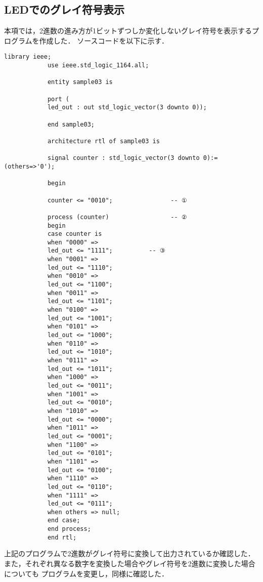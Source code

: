 \documentclass{ltjsarticle}
\begin{document}
	\subsection{LEDでのグレイ符号表示}
		本項では，2進数の進み方が1ビットずつしか変化しないグレイ符号を表示するプログラムを作成した．
		ソースコードを以下に示す．
		\begin{lstlisting}[caption=sample3, label=code:sample3]
			library ieee;
			use ieee.std_logic_1164.all;

			entity sample03 is

			port (
			led_out : out std_logic_vector(3 downto 0));

			end sample03;

			architecture rtl of sample03 is

			signal counter : std_logic_vector(3 downto 0):= (others=>'0');

			begin

			counter <= "0010";                -- ①

			process (counter)                 -- ②
			begin
			case counter is
			when "0000" =>
			led_out <= "1111";          -- ③
			when "0001" =>
			led_out <= "1110";
			when "0010" =>
			led_out <= "1100";
			when "0011" =>
			led_out <= "1101";
			when "0100" =>
			led_out <= "1001";
			when "0101" =>
			led_out <= "1000";
			when "0110" =>
			led_out <= "1010";
			when "0111" =>
			led_out <= "1011";
			when "1000" =>
			led_out <= "0011";
			when "1001" =>
			led_out <= "0010";
			when "1010" =>
			led_out <= "0000";
			when "1011" =>
			led_out <= "0001";
			when "1100" =>
			led_out <= "0101";
			when "1101" =>
			led_out <= "0100";
			when "1110" =>
			led_out <= "0110";
			when "1111" =>
			led_out <= "0111";
			when others => null;
			end case;
			end process;
			end rtl;

		\end{lstlisting}

		上記のプログラムで2進数がグレイ符号に変換して出力されているか確認した．
		また，それぞれ異なる数字を変換した場合やグレイ符号を2進数に変換した場合についても
		プログラムを変更し，同様に確認した．
\end{document}
